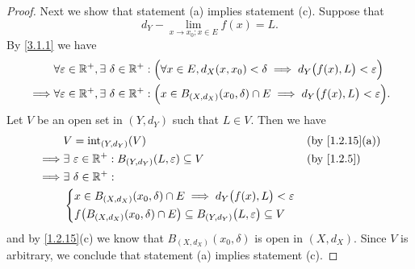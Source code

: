 \begin{proof}
  Next we show that statement (a) implies statement (c).
  Suppose that
  \[
    d_Y - \lim_{x \to x_0 ; x \in E} f(x) = L.
  \]
  By \cref{3.1.1} we have
  \begin{align*}
             & \forall \varepsilon \in \mathbb{R}^+, \exists\ \delta \in \mathbb{R}^+ : \Big(\forall x \in E, d_X(x, x_0) < \delta \implies d_Y\big(f(x), L\big) < \varepsilon\Big)   \\
    \implies & \forall \varepsilon \in \mathbb{R}^+, \exists\ \delta \in \mathbb{R}^+ : \Big(x \in B_{(X, d_X)}(x_0, \delta) \cap E \implies d_Y\big(f(x), L\big) < \varepsilon\Big).
  \end{align*}
  Let \(V\) be an open set in \((Y, d_Y)\) such that \(L \in V\).
  Then we have
  \begin{align*}
             & V = \text{int}_{(Y, d_Y)}(V)                                                                           &  & \text{(by \cref{1.2.15}(a))} \\
    \implies & \exists\ \varepsilon \in \R^+ : B_{(Y, d_Y)}(L, \varepsilon) \subseteq V                               &  & \by{1.2.5}                   \\
    \implies & \exists\ \delta \in \R^+ :                                                                                                               \\
             & \begin{dcases}
                 x \in B_{(X, d_X)}(x_0, \delta) \cap E \implies d_Y\big(f(x), L\big) < \varepsilon \\
                 f\big(B_{(X, d_X)}(x_0, \delta) \cap E\big) \subseteq B_{(Y, d_Y)}\big(L, \varepsilon\big) \subseteq V
               \end{dcases}
  \end{align*}
  and by \cref{1.2.15}(c) we know that \(B_{(X, d_X)}(x_0, \delta)\) is open in \((X, d_X)\).
  Since \(V\) is arbitrary, we conclude that statement (a) implies statement (c).


\end{proof}
